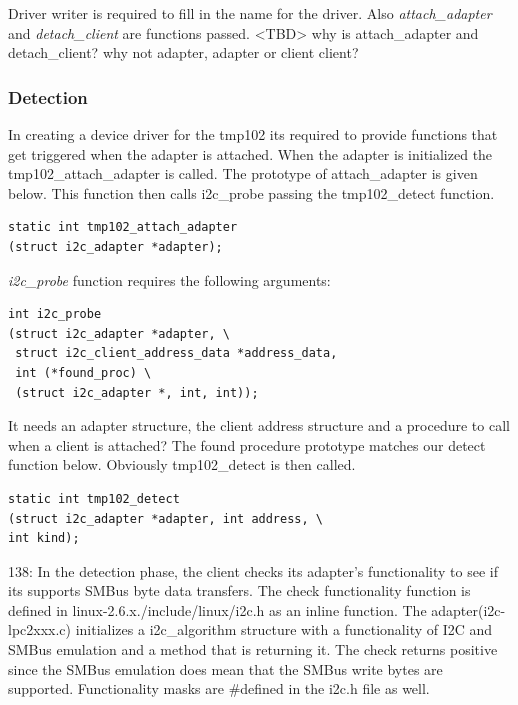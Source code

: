 \documentclass{article}
\begin{document}
Driver writer is required to fill in the name for the driver. Also \emph{attach\_adapter} and \emph{detach\_client} are functions passed. <TBD> why is attach\_adapter and detach\_client? why not adapter, adapter or client client? 



\subsubsection{Detection}
In creating a device driver for the tmp102 its required to provide functions that get triggered when the adapter is attached. When the adapter is initialized the tmp102\_attach\_adapter is called. The prototype of attach\_adapter is given below. This function then calls i2c\_probe passing the tmp102\_detect function. 

\begin{verbatim}
static int tmp102_attach_adapter
(struct i2c_adapter *adapter);
\end{verbatim}

\emph{i2c\_probe} function requires the following arguments: 
\begin{verbatim}
int i2c_probe
(struct i2c_adapter *adapter, \
 struct i2c_client_address_data *address_data, 
 int (*found_proc) \
 (struct i2c_adapter *, int, int));
\end{verbatim}

It needs an adapter structure, the client address structure and a procedure to call when a client is attached? The found procedure prototype matches our detect function below. Obviously tmp102\_detect is then called. 

\begin{verbatim}
static int tmp102_detect
(struct i2c_adapter *adapter, int address, \
int kind);
\end{verbatim}

138: In the detection phase, the client checks its adapter's functionality to see if its supports SMBus byte data transfers. The check functionality function is defined in linux-2.6.x./include/linux/i2c.h as an inline function. The adapter(i2c-lpc2xxx.c) initializes a i2c\_algorithm structure with a functionality of I2C and SMBus emulation and a method that is returning it. The check returns positive since the SMBus emulation does mean that the SMBus write bytes are supported. Functionality masks are \#defined in the i2c.h file as well. 
\end{document}
